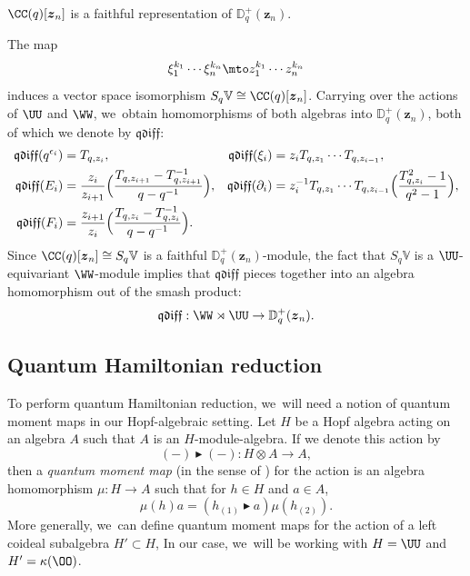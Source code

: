 \begin{prop}
$\CC(q)[\boldsymbol{z}_n]$ is a faithful representation of $\mathbb{D}_q^+(\boldsymbol{z}_n)$.
\end{prop}

The map
\[
\xi_1^{k_1}\cdots \xi_n^{k_n}\mto z_1^{k_1}\cdots z_n^{k_n}
\]
induces a vector space isomorphism $S_q\mathbb{V}\cong\CC(q)[\boldsymbol{z}_n]$.
Carrying over the actions of $\UU$ and $\WW$, we~obtain homomorphisms of both algebras into $\mathbb{D}_q^+(\boldsymbol{z}_n)$, both of which we denote by $\mathfrak{qdiff}$:
\begin{equation}
\begin{aligned}
\mathfrak{qdiff}(q^{\epsilon_i})&= T_{q,z_i},&
\mathfrak{qdiff}(\xi_i)&=z_i T_{q, z_1}\cdots T_{q,z_{i-1}},\\
\mathfrak{qdiff}(E_i)&= \frac{z_{i}}{z_{i+1}}\Bigl(\frac{T_{q,z_{i+1}}-T_{q, z_{i+1}}^{-1}}{q-q^{-1}} \Bigr),&
\mathfrak{qdiff}(\partial_i)&= z_i^{-1}T_{q,z_1}\cdots T_{q,z_{i-1}}\Bigl(\frac{T_{q,z_i}^2-1}{q^2-1} \Bigr),\\
\mathfrak{qdiff}(F_i)&= \frac{z_{i+1}}{z_i}\Bigl(\frac{T_{q,z_i}-T_{q, z_i}^{-1}}{q-q^{-1}} \Bigr).
\end{aligned}
\label{QDiffMap}
\end{equation}
Since $\CC(q)[\boldsymbol{z}_n]\cong S_q\mathbb{V}$ is a faithful $\mathbb{D}^+_q(\boldsymbol{z}_n)$-module, the fact that $S_q\mathbb{V}$ is a $\UU$-equivariant $\WW$-module implies that $\mathfrak{qdiff}$ pieces together into an algebra homomorphism out of the smash product:
\[
\mathfrak{qdiff}:\WW\rtimes\UU\to\mathbb{D}^+_q(\boldsymbol{z}_n).
\]

\subsection{Quantum Hamiltonian reduction}
To perform quantum Hamiltonian reduction, we~will need a notion of quantum moment maps in our Hopf-algebraic setting.
Let $H$ be a Hopf algebra acting on an algebra $A$ such that $A$ is an $H$-module-algebra.
If we denote this action by
\[
(-)\blacktriangleright(-):H\otimes A\to A,
\]
then a \textit{quantum moment map} (in the sense of \cite{VarVassRoot}) for the action is an algebra homomorphism $\mu:H\to A$ such that for $h\in H$ and $a\in A$,
\begin{equation}
\mu(h)a=(h_{(1)}\blacktriangleright a)\mu(h_{(2)}).
\label{QMMDef}
\end{equation}
More generally, we~can define quantum moment maps for the action of a left coideal subalgebra $H'\subset H$,
In our case, we~will be working with $H=\UU$ and $H'=\kappa(\OO)$.


